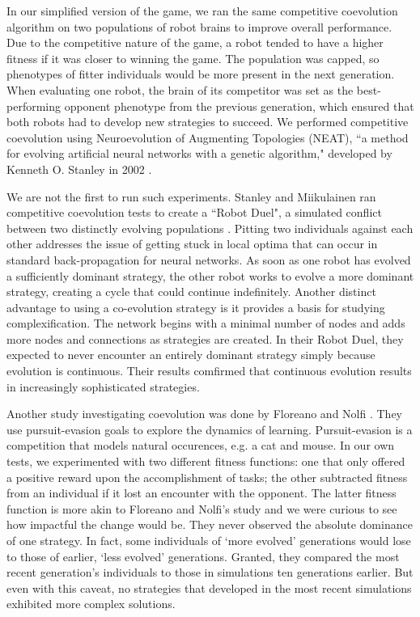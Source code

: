 \documentclass[11pt]{article}
\begin{document}
  In our simplified version of the game, we ran the same competitive coevolution algorithm on two populations of robot brains to improve overall performance. Due to the competitive nature of the game, a robot tended to have a higher fitness if it was closer to winning the game. The population was capped, so phenotypes of fitter individuals would be more present in the next generation. When evaluating one robot, the brain of its competitor was set as the best-performing opponent phenotype from the previous generation, which ensured that both robots had to develop new strategies to succeed. We performed competitive coevolution using Neuroevolution of Augmenting Topologies (NEAT), ``a method for evolving artificial neural networks with a genetic algorithm," developed by Kenneth O. Stanley in 2002 \cite{NEAT_website}.
  
We are not the first to run such experiments.  Stanley and Miikulainen ran competitive coevolution tests to create a ``Robot Duel", a simulated conflict between two distinctly evolving populations \cite{NEAT}. Pitting two individuals against each other addresses the issue of getting stuck in local optima that can occur in standard back-propagation for neural networks.  As soon as one robot has evolved a sufficiently dominant strategy, the other robot works to evolve a more dominant strategy, creating a cycle that could continue indefinitely. Another distinct advantage to using a co-evolution strategy is it provides a basis for studying complexification. The network begins with a minimal number of nodes and adds more nodes and connections as strategies are created. In their Robot Duel, they expected to never encounter an entirely dominant strategy simply because evolution is continuous.  Their results comfirmed that continuous evolution results in increasingly sophisticated strategies.

Another study investigating coevolution was done by Floreano and Nolfi \cite{red_queen}. They use pursuit-evasion goals to explore the dynamics of learning. Pursuit-evasion is a competition that models natural occurences, e.g. a cat and mouse.  In our own tests, we experimented with two different fitness functions: one that only offered a positive reward upon the accomplishment of tasks; the other subtracted fitness from an individual if it lost an encounter with the opponent.  The latter fitness function is more akin to Floreano and Nolfi's study and we were curious to see how impactful the change would be. They never observed the absolute dominance of one strategy. In fact, some individuals of `more evolved' generations would lose to those of earlier, `less evolved' generations.  Granted, they compared the most recent generation's individuals to those in simulations ten generations earlier.  But even with this caveat, no strategies  that developed in the most recent simulations exhibited more complex solutions. 
\end{document}

